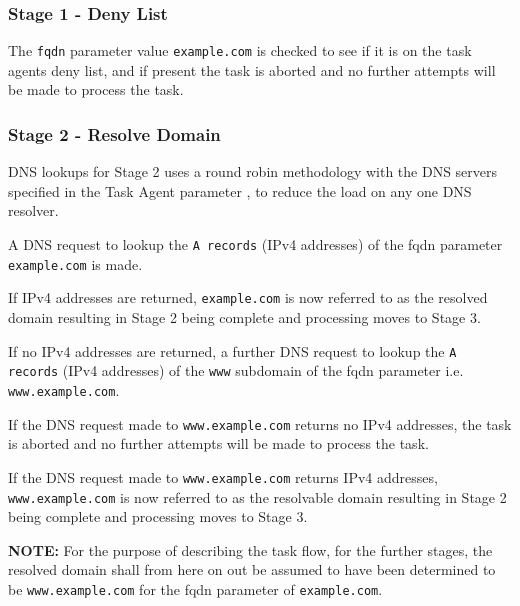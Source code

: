 \documentclass{mscreport}
\begin{document}
\subsubsection{Stage 1 - Deny List}

The \texttt{fqdn} parameter value \texttt{example.com} is checked to see if it is on the task agents deny list, and if present the task is aborted and no further attempts will be made to process the task.

\subsubsection{Stage 2 - Resolve Domain}

DNS lookups for Stage 2 uses a round robin methodology with the DNS servers specified in the Task Agent parameter \texttt{}, to reduce the load on any one DNS resolver.

\vspace{0.3cm} \noindent
A DNS request to lookup the \texttt{A records} (IPv4 addresses) of the fqdn parameter \texttt{example.com} is made.

\vspace{0.3cm} \noindent
If IPv4 addresses are returned, \texttt{example.com} is now referred to as the resolved domain resulting in Stage 2 being complete and processing moves to Stage 3.

\vspace{0.3cm} \noindent
If no IPv4 addresses are returned, a further DNS request to lookup the \texttt{A records} (IPv4 addresses) of the \texttt{www} subdomain of the fqdn parameter i.e. \texttt{www.example.com}.

\vspace{0.3cm} \noindent
If the DNS request made to \texttt{www.example.com} returns no IPv4 addresses, the task is aborted and no further attempts will be made to process the task.

\vspace{0.3cm} \noindent
If the DNS request made to \texttt{www.example.com} returns IPv4 addresses, \texttt{www.example.com} is now referred to as the resolvable domain resulting in Stage 2 being complete and processing moves to Stage 3.

\vspace{0.3cm} \noindent
\textbf{NOTE:} For the purpose of describing the task flow, for the further stages, the resolved domain shall from here on out be assumed to have been determined to be \texttt{www.example.com} for the fqdn parameter of \texttt{example.com}.
\end{document}
